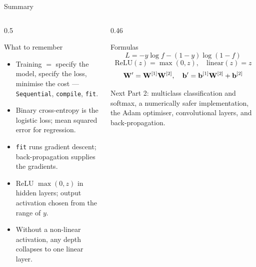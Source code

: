 \documentclass[aspectratio=169,10pt]{beamer}
\begin{document}
\begin{frame}{Summary}
  \begin{columns}[T,onlytextwidth]
    \begin{column}{0.5\textwidth}
      \begin{block}{What to remember}
        \footnotesize
        \begin{itemize}
          \item Training $=$ specify the model, specify the loss, minimise the cost ---
                \texttt{Sequential}, \texttt{compile}, \texttt{fit}.
          \item Binary cross-entropy is the logistic loss; mean squared error for
                regression.
          \item \texttt{fit} runs gradient descent; back-propagation supplies the
                gradients.
          \item ReLU $\max(0,z)$ in hidden layers; output activation chosen from the range
                of $y$.
          \item Without a non-linear activation, any depth collapses to one linear layer.
        \end{itemize}
      \end{block}
    \end{column}
    \begin{column}{0.46\textwidth}
      \begin{block}{Formulas}
        \[ L=-y\log f-(1-y)\log(1-f) \]
        \[ \text{ReLU}(z)=\max(0,z),\quad \text{linear}(z)=z \]
        \[ \mathbf{W}'=\mathbf{W}^{[1]}\mathbf{W}^{[2]},\quad \mathbf{b}'=\mathbf{b}^{[1]}\mathbf{W}^{[2]}+\mathbf{b}^{[2]} \]
      \end{block}
      \begin{block}{Next}
        \footnotesize Part 2: multiclass classification and softmax, a numerically safer
        implementation, the Adam optimiser, convolutional layers, and back-propagation.
      \end{block}
    \end{column}
  \end{columns}
\end{frame}
\end{document}
